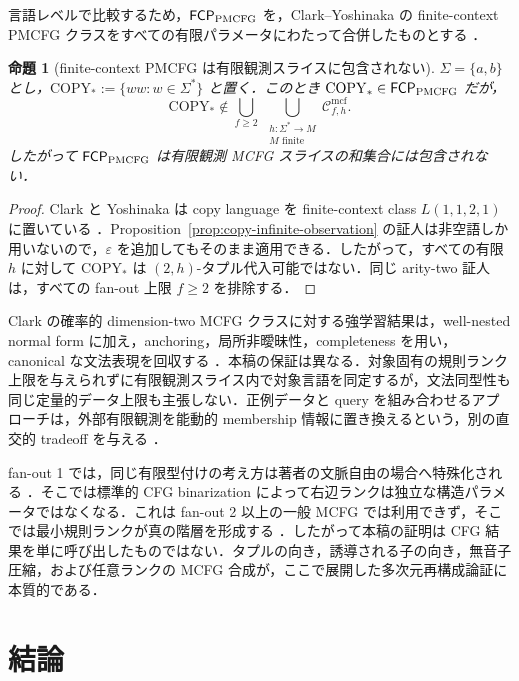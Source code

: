 \documentclass[11pt,a4paper]{ltjsarticle}
\numberwithin{equation}{section}
\theoremstyle{plain}
\newtheorem{proposition}[theorem]{命題}
\theoremstyle{definition}
\theoremstyle{remark}
\newcommand{\Cmcf}[2]{\mathcal{C}^{\mathrm{mcf}}_{#1,#2}}
\newcommand{\eps}{\varepsilon}
\begin{document}
言語レベルで比較するため，$\mathsf{FCP}_{\rm PMCFG}$ を，Clark--Yoshinaka の finite-context PMCFG クラスをすべての有限パラメータにわたって合併したものとする
\cite{ClarkYoshinaka2012PMCFG,ClarkYoshinaka2014}．

\begin{proposition}[finite-context PMCFG は有限観測スライスに包含されない]
\label{prop:fcp-not-contained-observation}
$\Sigma=\{a,b\}$ とし，$\mathrm{COPY}_*:=\{ww:w\in\Sigma^*\}$ と置く．このとき
$\mathrm{COPY}_*\in\mathsf{FCP}_{\rm PMCFG}$ だが，
\[
 \mathrm{COPY}_*\notin
 \bigcup_{f\ge2}\ \bigcup_{\substack{h:\Sigma^*\to M\\ M\text{ finite}}}
 \Cmcf{f}{h}.
\]
したがって $\mathsf{FCP}_{\rm PMCFG}$ は有限観測 MCFG スライスの和集合には包含されない．
\end{proposition}

\begin{proof}
Clark と Yoshinaka は copy language を finite-context class $L(1,1,2,1)$ に置いている \cite[Definition~2 and Example~3]{ClarkYoshinaka2012PMCFG}．Proposition~\ref{prop:copy-infinite-observation} の証人は非空語しか用いないので，$\eps$ を追加してもそのまま適用できる．したがって，すべての有限 $h$ に対して $\mathrm{COPY}_*$ は $(2,h)$-タプル代入可能ではない．同じ arity-two 証人は，すべての fan-out 上限 $f\ge2$ を排除する．
\end{proof}

Clark の確率的 dimension-two MCFG クラスに対する強学習結果は，well-nested normal form に加え，anchoring，局所非曖昧性，completeness を用い，canonical な文法表現を回収する \cite{Clark2021Strong}．本稿の保証は異なる．対象固有の規則ランク上限を与えられずに有限観測スライス内で対象言語を同定するが，文法同型性も同じ定量的データ上限も主張しない．正例データと query を組み合わせるアプローチは，外部有限観測を能動的 membership 情報に置き換えるという，別の直交的 tradeoff を与える
\cite{Yoshinaka2010,KanazawaYoshinaka2021,KanazawaYoshinaka2023,YoshinakaClark2012}．

fan-out 1 では，同じ有限型付けの考え方は著者の文脈自由の場合へ特殊化される \cite{kuriyamaCFG}．そこでは標準的 CFG binarization によって右辺ランクは独立な構造パラメータではなくなる．これは fan-out 2 以上の一般 MCFG では利用できず，そこでは最小規則ランクが真の階層を形成する \cite{RambowSatta1999}．したがって本稿の証明は CFG 結果を単に呼び出したものではない．タプルの向き，誘導される子の向き，無音子圧縮，および任意ランクの MCFG 合成が，ここで展開した多次元再構成論証に本質的である．


\section{結論}
\label{sec:conclusion}
\end{document}
